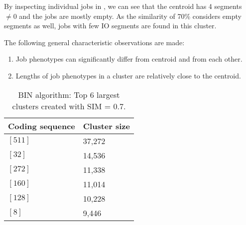 \documentclass{jhps}
\begin{document}
By inspecting individual jobs in , we can see that the centroid has 4 segments $\neq 0$ and the jobs are mostly empty.
As the similarity of 70\% considers empty segments as well, jobs with few IO segments are found in this cluster.

The following general characteristic observations are made:
\begin{enumerate}
 \item Job phenotypes can significantly differ from centroid and from each other.
 \item Lengths of job phenotypes in a cluster are relatively close to the centroid.
\end{enumerate}

\begin{table}
	\centering
	\begin{tabular}{ll}
		Coding sequence & Cluster size \\
		\hline
		$[511]$ & 37,272 \\
		$[32]$  & 14,536 \\
		$[272]$ & 11,338 \\
		$[160]$ & 11,014 \\
		$[128]$ & 10,228 \\
		$[8]$   & 9,446  \\
	\end{tabular}
	\caption{BIN algorithm: Top 6 largest clusters created with SIM = 0.7.}
	\label{tab:bin:largest_clusters}
\end{table}
\end{document}
